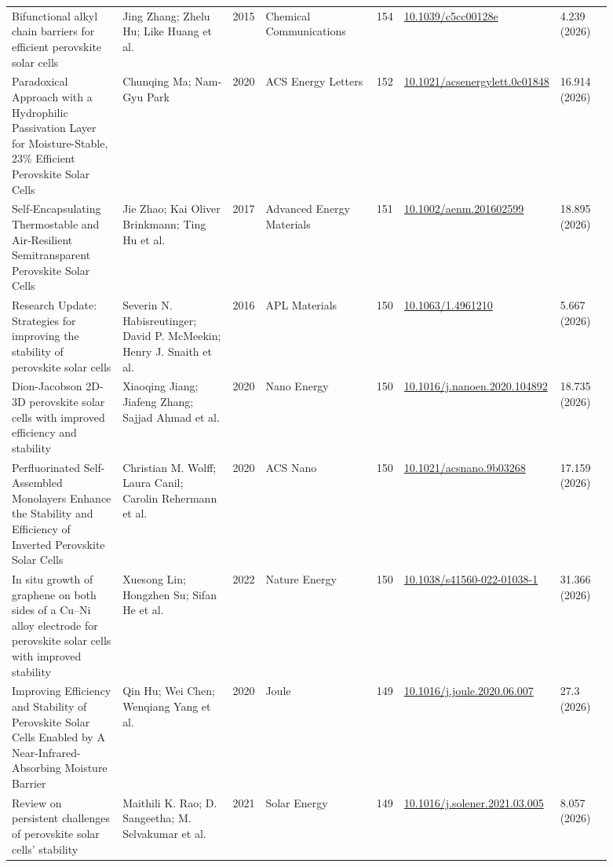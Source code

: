 \documentclass[10pt,a4paper]{article}
\begin{document}
{\begin{longtable}{p{0.197\linewidth}p{0.197\linewidth}p{0.043\linewidth}p{0.197\linewidth}p{0.043\linewidth}p{0.117\linewidth}p{0.098\linewidth}}
Bifunctional alkyl chain barriers for efficient perovskite solar cells & Jing Zhang; Zhelu Hu; Like Huang et al. & 2015 & Chemical Communications & 154 & \href{https://doi.org/10.1039/c5cc00128e}{10.1039/c5cc00128e} & 4.239 (2026) \\
Paradoxical Approach with a Hydrophilic Passivation Layer for Moisture-Stable, 23\% Efficient Perovskite Solar Cells & Chunqing Ma; Nam‐Gyu Park & 2020 & ACS Energy Letters & 152 & \href{https://doi.org/10.1021/acsenergylett.0c01848}{10.1021/acsenergylett.0c01848} & 16.914 (2026) \\
Self‐Encapsulating Thermostable and Air‐Resilient Semitransparent Perovskite Solar Cells & Jie Zhao; Kai Oliver Brinkmann; Ting Hu et al. & 2017 & Advanced Energy Materials & 151 & \href{https://doi.org/10.1002/aenm.201602599}{10.1002/aenm.201602599} & 18.895 (2026) \\
Research Update: Strategies for improving the stability of perovskite solar cells & Severin N. Habisreutinger; David P. McMeekin; Henry J. Snaith et al. & 2016 & APL Materials & 150 & \href{https://doi.org/10.1063/1.4961210}{10.1063/1.4961210} & 5.667 (2026) \\
Dion-Jacobson 2D-3D perovskite solar cells with improved efficiency and stability & Xiaoqing Jiang; Jiafeng Zhang; Sajjad Ahmad et al. & 2020 & Nano Energy & 150 & \href{https://doi.org/10.1016/j.nanoen.2020.104892}{10.1016/j.nanoen.2020.104892} & 18.735 (2026) \\
Perfluorinated Self-Assembled Monolayers Enhance the Stability and Efficiency of Inverted Perovskite Solar Cells & Christian M. Wolff; Laura Canil; Carolin Rehermann et al. & 2020 & ACS Nano & 150 & \href{https://doi.org/10.1021/acsnano.9b03268}{10.1021/acsnano.9b03268} & 17.159 (2026) \\
In situ growth of graphene on both sides of a Cu–Ni alloy electrode for perovskite solar cells with improved stability & Xuesong Lin; Hongzhen Su; Sifan He et al. & 2022 & Nature Energy & 150 & \href{https://doi.org/10.1038/s41560-022-01038-1}{10.1038/s41560-022-01038-1} & 31.366 (2026) \\
Improving Efficiency and Stability of Perovskite Solar Cells Enabled by A Near-Infrared-Absorbing Moisture Barrier & Qin Hu; Wei Chen; Wenqiang Yang et al. & 2020 & Joule & 149 & \href{https://doi.org/10.1016/j.joule.2020.06.007}{10.1016/j.joule.2020.06.007} & 27.3 (2026) \\
Review on persistent challenges of perovskite solar cells’ stability & Maithili K. Rao; D. Sangeetha; M. Selvakumar et al. & 2021 & Solar Energy & 149 & \href{https://doi.org/10.1016/j.solener.2021.03.005}{10.1016/j.solener.2021.03.005} & 8.057 (2026) \\

\end{longtable}}
\end{document}
